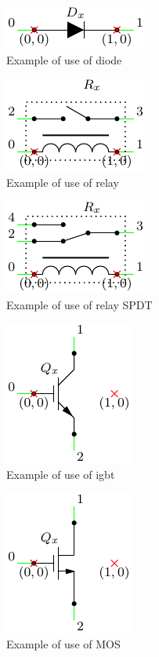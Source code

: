\documentclass[a4paper,12pt]{article}
\begin{document}
\begin{figure}[h]
\centering
\includegraphics{diodeInfo}
\caption{Example of use of diode}
\label{diodeInfo} %
\end{figure}

\begin{figure}[h]
\centering
\includegraphics{relayInfo}
\caption{Example of use of relay}
\label{relayInfo} %
\end{figure}

\begin{figure}[h]
\centering
\includegraphics{relaySPDTInfo}
\caption{Example of use of relay SPDT}
\label{relaySPDTInfo} %
\end{figure}

\begin{figure}[h]
\centering
\includegraphics{igbtInfo}
\caption{Example of use of igbt}
\label{igbtrInfo} %
\end{figure}

\begin{figure}[h]
\centering
\includegraphics{mosInfo}
\caption{Example of use of MOS}
\label{mosInfo} %
\end{figure}
\end{document}
